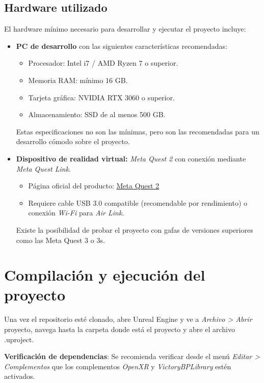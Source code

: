 \subsection{Hardware utilizado}

El hardware mínimo necesario para desarrollar y ejecutar el proyecto incluye:

\begin{itemize}
    \item \textbf{PC de desarrollo} con las siguientes características recomendadas:
    \begin{itemize}
        \item Procesador: Intel i7 / AMD Ryzen 7 o superior.
        \item Memoria RAM: mínimo 16 GB.
        \item Tarjeta gráfica: NVIDIA RTX 3060 o superior.
        \item Almacenamiento: SSD de al menos 500 GB.
    \end{itemize}

    Estas especificaciones no son las mínimas, pero son las recomendadas para un desarrollo cómodo sobre el proyecto.
    
    \item \textbf{Dispositivo de realidad virtual:} \textit{Meta Quest 2} con conexión mediante \textit{Meta Quest Link}.
    \begin{itemize}
        \item Página oficial del producto: \href{https://www.meta.com/quest/meta-quest-2/}{Meta Quest 2}
        \item Requiere cable USB 3.0 compatible (recomendable por rendimiento) o conexión \textit{Wi-Fi} para \textit{Air Link}.
    \end{itemize}

    Existe la posibilidad de probar el proyecto con gafas de versiones superiores como las Meta Quest 3
    o 3s.
\end{itemize}

\section{Compilación y ejecución del proyecto}
Una vez el repositorio esté clonado, abre Unreal Engine y ve a \textit{Archivo > Abrir} proyecto, navega hasta la carpeta donde está el proyecto y abre el archivo .uproject.

\textbf{Verificación de dependencias}: Se recomienda verificar desde el menú \textit{Editar > Complementos} que los complementos \textit{OpenXR} y \textit{VictoryBPLibrary} estén activados. 

